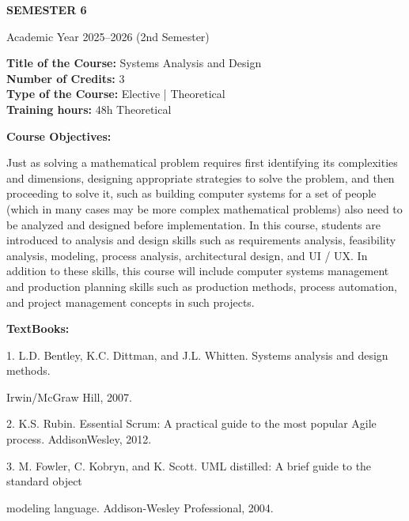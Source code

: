 \documentclass[12pt,a4paper]{article}
\begin{document}
\newpage
\vspace*{\fill}
\begin{center}
  {\fontsize{28pt}{34pt}\selectfont \textbf{SEMESTER 6}}\par\vspace{12pt}
  {\fontsize{13pt}{17pt}\selectfont Academic Year 2025–2026 (2nd Semester)}
\end{center}
\vspace*{\fill}

\newpage
\textbf{Title of the Course:} Systems Analysis and Design\\
\textbf{Number of Credits:} 3\\
\textbf{Type of the Course:} Elective | Theoretical\\
\textbf{Training hours:} 48h Theoretical\par\vspace{4pt}
\textbf{Course Objectives:}\par\vspace{2pt}
Just as solving a mathematical problem requires first identifying its complexities and dimensions,
designing appropriate strategies to solve the problem, and then proceeding to solve it, such as
building computer systems for a set of people (which in many cases may be more complex
mathematical problems) also need to be analyzed and designed before implementation. In this
course, students are introduced to analysis and design skills such as requirements analysis,
feasibility analysis, modeling, process analysis, architectural design, and UI / UX. In addition to
these skills, this course will include computer systems management and production planning skills
such as production methods, process automation, and project management concepts in such
projects.\par\vspace{4pt}
\textbf{TextBooks:}\par\vspace{2pt}
1. L.D. Bentley, K.C. Dittman, and J.L. Whitten. Systems analysis and design methods.\par
Irwin/McGraw Hill, 2007.\par
2. K.S. Rubin. Essential Scrum: A practical guide to the most popular Agile process. AddisonWesley, 2012.\par
3. M. Fowler, C. Kobryn, and K. Scott. UML distilled: A brief guide to the standard object\par
modeling language. Addison-Wesley Professional, 2004.\par
\vspace{4pt}
\end{document}
